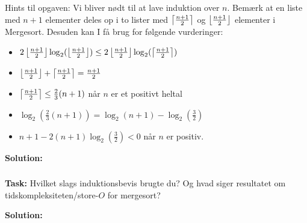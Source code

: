 	Hints til opgaven: Vi bliver nødt til at lave induktion over $n$. Bemærk at en liste med $n+1$ elementer deles op i to lister med $\left\lceil{\frac{n+1}{2}}\right\rceil$ og $\left\lfloor{\frac{n+1}{2}}\right\rfloor$ elementer i Mergesort. Desuden kan I få brug for følgende vurderinger:
	\begin{itemize}
		\item $2\left\lfloor{\frac{n+1}{2}}\right\rfloor\log_2(\left\lfloor{\frac{n+1}{2}}\right\rfloor)\leq 2\left\lfloor{\frac{n+1}{2}}\right\rfloor\log_2(\left\lceil{\frac{n+1}{2}}\right\rceil)$
		\item $\left\lfloor{\frac{n+1}{2}}\right\rfloor+\left\lceil{\frac{n+1}{2}}\right\rceil=\frac{n+1}{2}$
		\item $\left\lceil{\frac{n+1}{2}}\right\rceil\leq \frac{2}{3}(n+1)$ når $n$ er et positivt heltal
		\item $\log_2(\frac{2}{3}(n+1))=\log_2(n+1)-\log_2(\frac{3}{2})$
		\item $n+1-2(n+1)\log_2(\frac{3}{2})<0$ når $n$ er positiv.
	\end{itemize}	 

\bigskip
\noindent
\textbf{Solution:} 
\subsubsection{}
\textbf{Task:} Hvilket slags induktionsbevis brugte du? Og hvad siger resultatet om tidskompleksiteten/store-$O$ for mergesort?

\bigskip
\noindent
\textbf{Solution:} 

